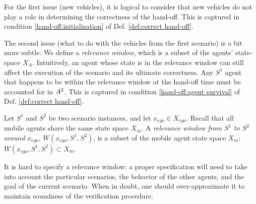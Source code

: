 For the first issue (new vehicles), it is logical to consider that new vehicles do not play a role in determining the correctness of the hand-off. 
This is captured in condition \ref{hand-off:initialization} of Def. \ref{def:correct hand-off}.

The second issue (what to do with the vehicles from the first scenario) is a bit more subtle. 
We define a \emph{relevance window}, which is a subset of the agents' state-space $X_A$.
Intuitively, an agent whose state is in the relevance window can still affect the execution of the scenario and its ultimate correctness.
Any $S^1$ agent that happens to be within the relevance window at the hand-off time must be accounted for in $A^2$. 
This is captured in condition \ref{hand-off:agent survival} of Def. \ref{def:correct hand-off}. 

\begin{defn}
	\label{def:relevance window}
	Let $S^1$ and $S^2$ be two scenario instances,
	and let $x_{ego} \in X_{ego}$.
	Recall that all mobile agents share the same state space $X_m$.
	A \emph{relevance window from $S^1$ to $S^2$ around $x_{ego}$}, $W(x_{ego}, S^1,S^2)$,  is a subset of the mobile agent state space $X_m$: $W(x_{ego}, S^1,S^2) \subset X_m$.
\end{defn}
It is hard to specify a relevance window: a proper specification will need to take into account the particular scenarios, the behavior of the other agents, and the goal of the current scenario.
When in doubt, one should over-approximate it to maintain soundness of the verification procedure.

